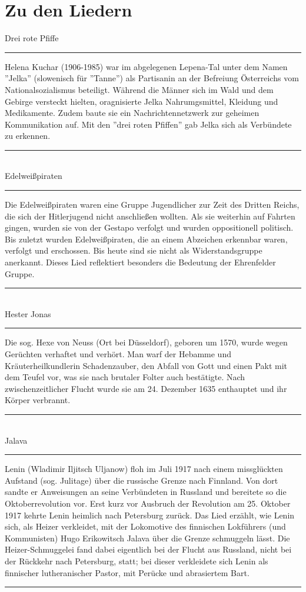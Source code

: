 \section*{Zu den Liedern}


Drei rote Pfiffe\\[-0.5em]
\noindent\rule{\textwidth}{0.2pt}
Helena Kuchar (1906-1985) war im abgelegenen Lepena-Tal unter dem Namen ''Jelka'' (slowenisch für ''Tanne'') als Partisanin an der Befreiung Österreichs vom Nationalsozialismus beteiligt.
Während die Männer sich im Wald und dem Gebirge versteckt hielten, oragnisierte Jelka Nahrumgsmittel, Kleidung und Medikamente.
Zudem baute sie ein Nachrichtennetzwerk zur geheimen Kommunikation auf. Mit den ''drei roten Pfiffen'' gab Jelka sich als Verbündete zu erkennen. \\[-0.5em]
\noindent\rule{\textwidth}{0.2pt} \\

Edelweißpiraten\\[-0.5em]
\noindent\rule{\textwidth}{0.2pt}
Die Edelweißpiraten waren eine Gruppe Jugendlicher zur Zeit des Dritten Reichs, die sich der Hitlerjugend nicht anschließen wollten.
Als sie weiterhin auf Fahrten gingen, wurden sie von der Gestapo verfolgt und wurden oppositionell politisch.
Bis zuletzt wurden Edelweißpiraten, die an einem Abzeichen erkennbar waren, verfolgt und erschossen.
Bis heute sind sie nicht als Widerstandsgruppe anerkannt. Dieses Lied reflektiert besonders die Bedeutung der Ehrenfelder Gruppe. \\[-0.5em]
\noindent\rule{\textwidth}{0.2pt} \\

Hester Jonas\\[-0.5em]
\noindent\rule{\textwidth}{0.2pt}
Die sog. Hexe von Neuss (Ort bei Düsseldorf), geboren um 1570, wurde wegen Gerüchten verhaftet und verhört.
Man warf der Hebamme und Kräuterheilkundlerin Schadenzauber, den Abfall von Gott und einen Pakt mit dem Teufel vor, was sie nach brutaler Folter auch bestätigte.
Nach zwischenzeitlicher Flucht wurde sie am 24. Dezember 1635 enthauptet und ihr Körper verbrannt. \\[-0.5em]
\noindent\rule{\textwidth}{0.2pt} \\

Jalava\\[-0.5em]
\noindent\rule{\textwidth}{0.2pt}
Lenin (Wladimir Iljitsch Uljanow) floh im Juli 1917 nach einem missglückten Aufstand (sog. Julitage) über die russische Grenze nach Finnland.
Von dort sandte er Anweisungen an seine Verbündeten in Russland und bereitete so die Oktoberrevolution vor.
Erst kurz vor Ausbruch der Revolution am 25. Oktober 1917 kehrte Lenin heimlich nach Petersburg zurück.
Das Lied erzählt, wie Lenin sich, als Heizer verkleidet, mit der Lokomotive des finnischen Lokführers (und Kommunisten) Hugo Erikowitsch Jalava über die Grenze schmuggeln lässt.
Die Heizer-Schmuggelei fand dabei eigentlich bei der Flucht aus Russland, nicht bei der Rückkehr nach Petersburg, statt; bei dieser verkleidete sich Lenin als finnischer lutheranischer Pastor, mit Perücke und abrasiertem Bart. \\[-0.5em]
\noindent\rule{\textwidth}{0.2pt}